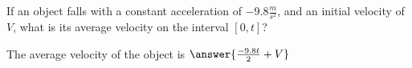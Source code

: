 \documentclass{ximera}
\author{Steven Gubkin}
\begin{document}
\begin{exercise}

If an object falls with a constant acceleration of $-9.8 \frac{m}{s^2}$, and an initial velocity of $V$, what is its average velocity on the interval $[0,t]$?

\begin{prompt}
	The average velocity of the object is $\answer{\frac{-9.8t}{2}+V}$
\end{prompt}
\end{exercise}
\end{document}
